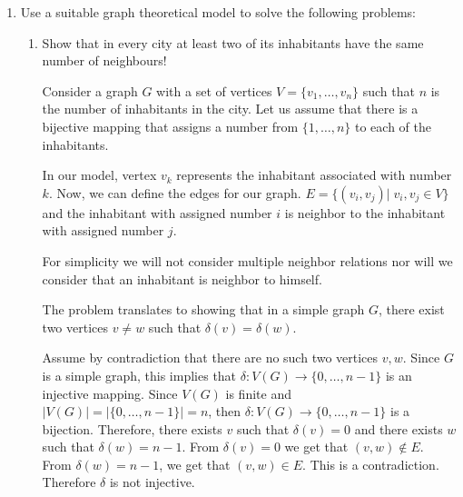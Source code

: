 \begin{enumerate}
\begin{enumerate}
\begin{center}
\end{center}
     
    \end{enumerate}
    
\item Use a suitable graph theoretical model to solve the following problems:
    \begin{enumerate}
        \item Show that in every city at least two of its inhabitants have the same number of neighbours!
        
        Consider a graph $G$ with a set of vertices $V = \{v_1, \ldots ,v_n \}$ such that $n$ is the number of inhabitants in the city. Let us assume that there is a bijective mapping that assigns a number from $\{1,\ldots,n\}$ to each of the inhabitants. 
        
        In our model, vertex $v_k$ represents the inhabitant associated with number $k$.
        Now, we can define the edges for our graph. $E = \{(v_i,v_j) \vert \; v_i, v_j \in V  \}$ and the inhabitant with assigned number $i$ is neighbor to the inhabitant with assigned number $j$. 
        
        For simplicity we will not consider multiple neighbor relations nor will we consider that an inhabitant is neighbor to himself.
        
        The problem translates to showing that in a simple graph $G$, there exist two vertices $v \neq w$ such that $\delta(v) = \delta(w)$.
        
        Assume by contradiction that there are no such two vertices $v,w$. Since $G$ is a simple graph, this implies that $\delta: V(G) \rightarrow \{0,\ldots,n-1\}$ is an injective mapping. Since $V(G)$ is finite and $\vert V(G) \vert =\vert \{0,\ldots,n-1\} \vert=n $, then $\delta :V(G) \rightarrow \{0,\ldots,n-1\}$ is a bijection. Therefore, there exists $v$ such that $\delta(v)=0$ and there exists $w$ such that $\delta(w)=n-1$. From $\delta(v)=0$ we get that $(v,w) \notin E$. From $\delta(w)=n-1$, we get that $(v,w) \in E$. This is a contradiction. Therefore $\delta$ is not injective. 
        

\end{enumerate}
\end{enumerate}
